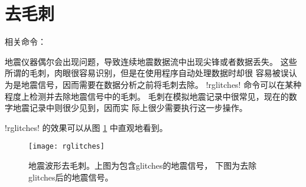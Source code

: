 \section{去毛刺}
相关命令：

地震仪器偶尔会出现问题，导致连续地震数据流中出现尖锋或者数据丢失。
这些所谓的毛刺，肉眼很容易识别，但是在使用程序自动处理数据时却很
容易被误认为是地震信号，因而需要在数据分析之前将毛刺去除。
!rglitches! 命令可以在某种程度上检测并去除地震信号中的毛刺。
毛刺在模拟地震记录中很常见，现在的数字地震记录中则很少见到，因而实
际上很少需要执行这一步操作。

!rglitches! 的效果可以从图 \ref{fig:deglitches} 中直观地看到。
\begin{figure}[H]
\centering
\texttt{[image: rglitches]}
\caption[地震波形去毛刺]{地震波形去毛刺。上图为包含glitches的地震信号，
    下图为去除glitches后的地震信号。}
\label{fig:deglitches}
\end{figure}

